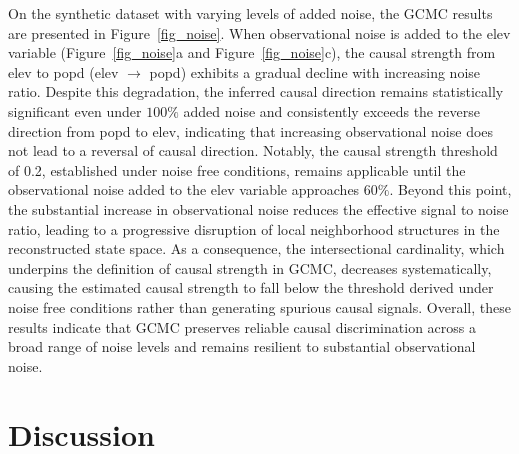 \documentclass[authoryear,preprint,review,12pt]{elsarticle}
\begin{document}
On the synthetic dataset with varying levels of added noise, the GCMC results are presented in Figure~\ref{fig_noise}. When observational noise is added to the elev variable (Figure~\ref{fig_noise}a and Figure~\ref{fig_noise}c), the causal strength from elev to popd (elev $\rightarrow$ popd) exhibits a gradual decline with increasing noise ratio. Despite this degradation, the inferred causal direction remains statistically significant even under $100\%$ added noise and consistently exceeds the reverse direction from popd to elev, indicating that increasing observational noise does not lead to a reversal of causal direction. Notably, the causal strength threshold of 0.2, established under noise free conditions, remains applicable until the observational noise added to the elev variable approaches $60\%$. Beyond this point, the substantial increase in observational noise reduces the effective signal to noise ratio, leading to a progressive disruption of local neighborhood structures in the reconstructed state space. As a consequence, the intersectional cardinality, which underpins the definition of causal strength in GCMC, decreases systematically, causing the estimated causal strength to fall below the threshold derived under noise free conditions rather than generating spurious causal signals. Overall, these results indicate that GCMC preserves reliable causal discrimination across a broad range of noise levels and remains resilient to substantial observational noise.

\section{Discussion}\label{sec4} 
\end{document}
